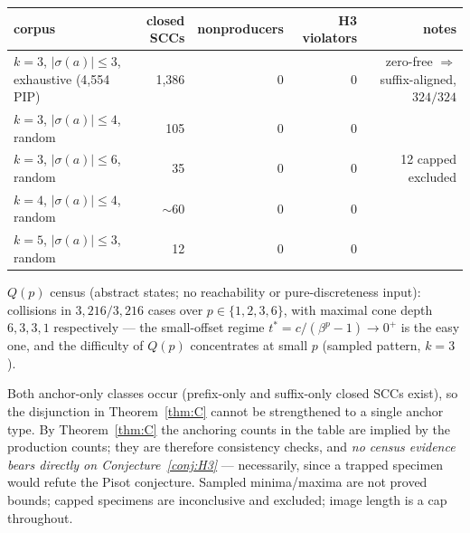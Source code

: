 \documentclass[11pt]{article}
\begin{document}
\begin{center}
\begin{tabular}{lrrrr}
\toprule
corpus & closed SCCs & nonproducers & H3 violators & notes\\
\midrule
$k=3$, $|\sigma(a)|\le3$, exhaustive (4{,}554 PIP) & 1{,}386 & 0 & 0 &
zero-free $\Rightarrow$ suffix-aligned, $324/324$\\
$k=3$, $|\sigma(a)|\le4$, random & 105 & 0 & 0 & \\
$k=3$, $|\sigma(a)|\le6$, random & 35 & 0 & 0 & 12 capped excluded\\
$k=4$, $|\sigma(a)|\le4$, random & $\sim$60 & 0 & 0 & \\
$k=5$, $|\sigma(a)|\le3$, random & 12 & 0 & 0 & \\
\bottomrule
\end{tabular}
\end{center}

$Q(p)$ census (abstract states; no reachability or pure-discreteness
input): collisions in $3{,}216/3{,}216$ cases over $p\in\{1,2,3,6\}$,
with maximal cone depth $6,3,3,1$ respectively --- the small-offset
regime $t^*=c/(\beta^p-1)\to0^+$ is the easy one, and the difficulty of
$Q(p)$ concentrates at small $p$ (sampled pattern, $k=3$).

Both anchor-only classes occur (prefix-only and suffix-only closed SCCs
exist), so the disjunction in Theorem~\ref{thm:C} cannot be strengthened
to a single anchor type. By Theorem~\ref{thm:C} the anchoring counts in
the table are implied by the production counts; they are therefore
consistency checks, and \emph{no census evidence bears directly on
Conjecture~\ref{conj:H3}} --- necessarily, since a trapped specimen
would refute the Pisot conjecture. Sampled minima/maxima are not proved
bounds; capped specimens are inconclusive and excluded; image length is
a cap throughout.
\end{document}

